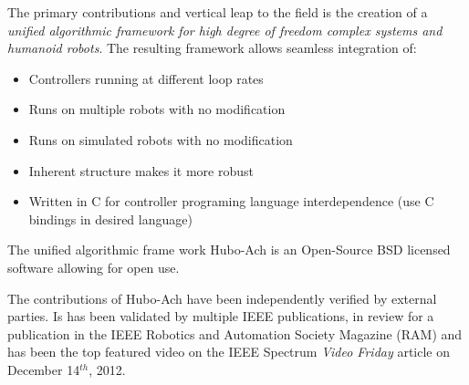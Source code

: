The primary contributions and vertical leap to the field is the creation of a \textit{unified algorithmic framework for high degree of freedom complex systems and humanoid robots}.
The resulting framework allows seamless integration of:
\begin{itemize}
\item Controllers running at different loop rates
\item Runs on multiple robots with no modification
\item Runs on simulated robots with no modification 
\item Inherent structure makes it more robust
\item Written in C for controller programing language interdependence (use C bindings in desired language)
\end{itemize}
The unified algorithmic frame work Hubo-Ach is an Open-Source BSD licensed software allowing for open use.

The contributions of Hubo-Ach have been independently verified by external parties\cite{tepraDoor2013,tepraCut2013}.
Is has been validated by multiple IEEE publications\cite{lofaroTePRA2013HuboAch,lofaroTePRA2013Valve}, in review for a publication in the IEEE Robotics and Automation Society Magazine (RAM)\cite{lofaroRAM2013} and has been the top featured video on the IEEE Spectrum \textit{Video Friday} article on December 14$^{th}$, 2012\cite{videoFriday}.
